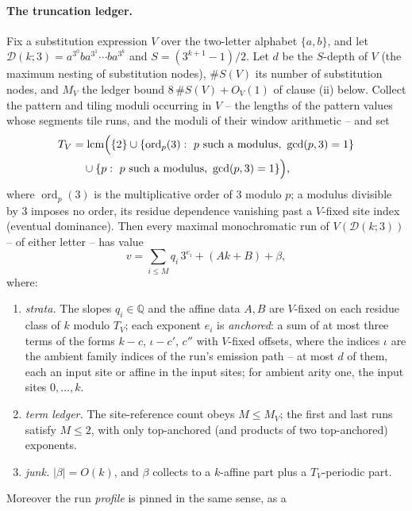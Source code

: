 \documentclass[runningheads,envcountsect]{llncs}
\begin{document}
\paragraph{The truncation ledger.}

\begin{theorem}
\label{thm:TL}
Fix a substitution expression $V$ over the two-letter alphabet
$\{a,b\}$, and let $\mathcal D(k;3)=a^{3^0}ba^{3^1}\cdots ba^{3^k}$
and $S=(3^{k+1}-1)/2$. Let $d$ be the $S$-depth of $V$ (the maximum
nesting of substitution nodes), $\#S(V)$ its number of substitution
nodes, and $M_V$ the ledger bound $8\,\#S(V)+O_V(1)$ of clause
{\rm(ii)} below. Collect the pattern and tiling moduli occurring in
$V$ -- the lengths of the pattern values whose segments tile runs, and
the moduli of their window arithmetic -- and set
\begin{align*}
T_V&=\operatorname{lcm}\Bigl(\{2\}\cup
\{\operatorname{ord}_p(3):\ \text{$p$ such a modulus, }\gcd(p,3)=1\}\\
&\quad\cup\{p:\ \text{$p$ such a modulus, }\gcd(p,3)=1\}\Bigr),
\end{align*}
where $\operatorname{ord}_p(3)$ is the multiplicative order of $3$
modulo $p$; a modulus divisible by $3$ imposes no order, its residue
dependence vanishing past a $V$-fixed site index (eventual
dominance). Then every maximal monochromatic run of
$V(\mathcal D(k;3))$ -- of either letter -- has value
\[
v=\sum_{i\le M}q_i\,3^{e_i}+(Ak+B)+\beta,
\]
where:
\begin{enumerate}
\item[\rm(i)] \emph{strata.} The slopes $q_i\in\mathbb Q$ and the
affine data $A,B$ are $V$-fixed on each residue class of $k$ modulo
$T_V$; each exponent $e_i$ is \emph{anchored}: a sum of at most
three terms of the forms $k-c$, $\iota-c'$, $c''$ with $V$-fixed
offsets, where the indices $\iota$ are the ambient family indices
of the run's emission path -- at most $d$ of them, each an input
site or affine in the input sites; for ambient arity one, the input
sites $0,\dots,k$.
\item[\rm(ii)] \emph{term ledger.} The site-reference count obeys
$M\le M_V$; the first and last runs satisfy $M\le 2$, with only
top-anchored (and products of two top-anchored) exponents.
\item[\rm(iii)] \emph{junk.} $|\beta|=O(k)$, and $\beta$ collects
to a $k$-affine part plus a $T_V$-periodic part.
\end{enumerate}
Moreover the run \emph{profile} is pinned in the same sense, as a

\end{theorem}
\end{document}

